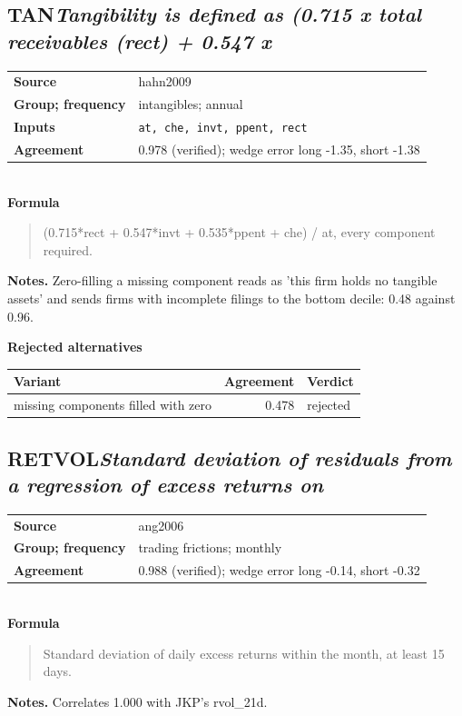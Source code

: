 \documentclass[11pt]{article}
\begin{document}
\subsection*{TAN\quad\normalfont\itshape Tangibility is defined as (0.715 x total receivables (rect) + 0.547 x}
\begin{tabular}{@{}p{3.3cm}p{12.3cm}@{}}
\textbf{Source} & hahn2009\\
\textbf{Group; frequency} & intangibles; annual\\
\textbf{Inputs} & \texttt{at, che, invt, ppent, rect}\\
\textbf{Agreement} & 0.978 (verified); wedge error long -1.35, short -1.38\\
\end{tabular}\\[4pt]
\textbf{Formula}
\begin{quote}\small
(0.715*rect + 0.547*invt + 0.535*ppent + che) / at, every component required.\\

\end{quote}
\textbf{Notes.} Zero-filling a missing component reads as 'this firm holds no tangible
assets' and sends firms with incomplete filings to the bottom decile: 0.48
against 0.96.

\textbf{Rejected alternatives}\\[2pt]
{\small\begin{longtable}{@{}p{9.6cm}rp{4.3cm}@{}}
\toprule Variant & Agreement & Verdict\\\midrule\endhead
missing components filled with zero & 0.478 & rejected\\
\bottomrule\end{longtable}}
\subsection*{RETVOL\quad\normalfont\itshape Standard deviation of residuals from a regression of excess returns on}
\begin{tabular}{@{}p{3.3cm}p{12.3cm}@{}}
\textbf{Source} & ang2006\\
\textbf{Group; frequency} & trading frictions; monthly\\
\textbf{Agreement} & 0.988 (verified); wedge error long -0.14, short -0.32\\
\end{tabular}\\[4pt]
\textbf{Formula}
\begin{quote}\small
Standard deviation of daily excess returns within the month, at least 15 days.\\

\end{quote}
\textbf{Notes.} Correlates 1.000 with JKP's rvol\_21d.
\end{document}
